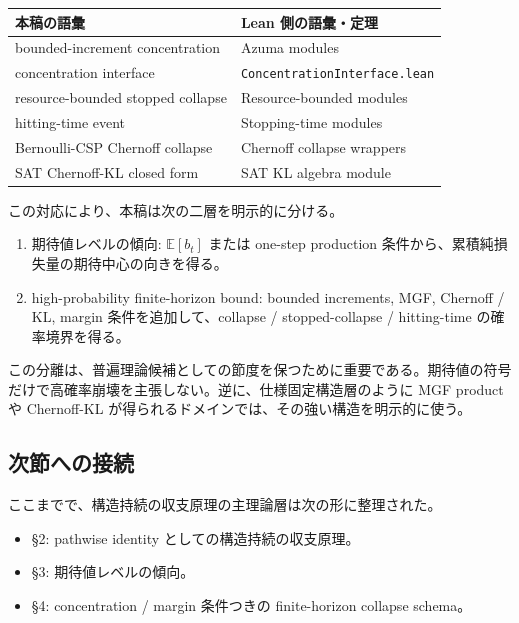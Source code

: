 \documentclass[12pt,a4paper]{article}
\begin{document}
{\def\LTcaptype{table} %
\begin{longtable}[]{@{}ll@{}}
\toprule\noalign{}
本稿の語彙 & Lean 側の語彙・定理 \\
\midrule\noalign{}
\endhead
\bottomrule\noalign{}
\endlastfoot
bounded-increment concentration & Azuma modules \\
concentration interface & \texttt{ConcentrationInterface.lean} \\
resource-bounded stopped collapse & Resource-bounded modules \\
hitting-time event & Stopping-time modules \\
Bernoulli-CSP Chernoff collapse & Chernoff collapse wrappers \\
SAT Chernoff-KL closed form & SAT KL algebra module \\
\end{longtable}
}

この対応により、本稿は次の二層を明示的に分ける。

\begin{enumerate}
\def\labelenumi{\arabic{enumi}.}
\tightlist
\item
  期待値レベルの傾向: \(\mathbb E[b_{t}]\) または one-step production 条件から、累積純損失量の期待中心の向きを得る。
\item
  high-probability finite-horizon bound: bounded increments, MGF, Chernoff / KL, margin 条件を追加して、collapse / stopped-collapse / hitting-time の確率境界を得る。
\end{enumerate}

この分離は、普遍理論候補としての節度を保つために重要である。期待値の符号だけで高確率崩壊を主張しない。逆に、仕様固定構造層のように MGF product や Chernoff-KL が得られるドメインでは、その強い構造を明示的に使う。

\subsection{次節への接続}\label{ux6b21ux7bc0ux3078ux306eux63a5ux7d9a-1}

ここまでで、構造持続の収支原理の主理論層は次の形に整理された。

\begin{itemize}
\tightlist
\item
  §2: pathwise identity としての構造持続の収支原理。
\item
  §3: 期待値レベルの傾向。
\item
  §4: concentration / margin 条件つきの finite-horizon collapse schema。
\end{itemize}
\end{document}
